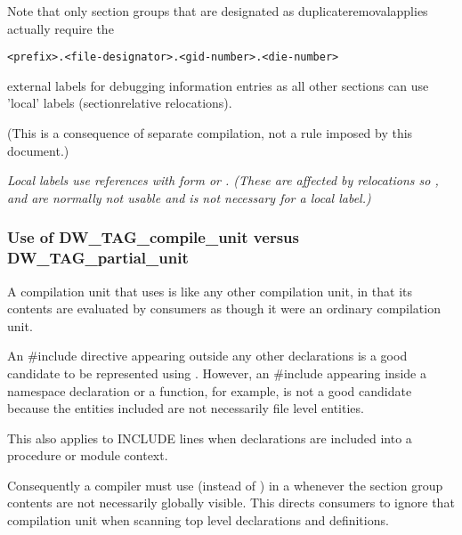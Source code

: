 Note that only 
section groups that are designated as
duplicate\dash removal\dash applies actually require the
\begin{alltt}
    <prefix>.<file-designator>.<gid-number>.<die-number>
\end{alltt}
external labels for debugging information entries as all other
 sections can use 'local' labels 
(section\dash relative
relocations).

(This is a consequence of separate compilation, not a rule
imposed by this document.)

\textit{Local labels use references with form 
or 
. 
(These are affected by relocations
so 
, 
 and 
 are
normally not usable and 
 is not necessary
for a local label.)}


\subsubsection{Use of DW\_TAG\_compile\_unit versus 
DW\_TAG\_partial\_unit}

A  compilation unit that uses 
is like any other compilation unit, in that its contents
are evaluated by consumers as though it were an ordinary
compilation unit.

An \#include directive appearing outside any other
declarations is a good candidate to be represented using
. 
However, an \#include appearing inside
a  namespace declaration or a function, for example, is
not a good candidate because the entities included are not
necessarily file level entities.

This also applies to  INCLUDE lines when declarations
are included into a procedure or module context.

Consequently a compiler must use  (instead
of ) 
in a  
whenever the section group 
contents are not necessarily globally visible. 
This
directs consumers to ignore that compilation unit when scanning
top level declarations and definitions.

